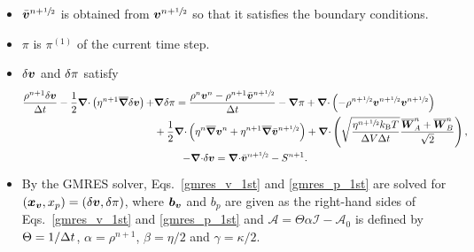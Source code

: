 \documentclass[
10pt
showpacs, showkeys,
amsmath,amssymb,
aps,
pre,
floatfix,
]{revtex4-1}
\newcommand{\divg}{{\V\nabla\cdot}}                       %
\newcommand{\paren}[1]{{(#1)}}                            %
\begin{document}
\begin{enumerate}
\begin{itemize}
\item $\bar{\boldsymbol{v}}^{n+\sfrac{1}{2}}$ is obtained from $\boldsymbol{v}^{n+\sfrac{1}{2}}$ so that it satisfies the boundary conditions.
\item $\pi$ is $\pi^\paren{1}$ of the current time step.
\item $\delta\boldsymbol{v}$ and $\delta\pi$ satisfy
\begin{gather}
\label{gmres_v_2nd}
\begin{split}
\frac{\rho^{n+1}\d{\V{v}}}{\D{t}} - \frac{1}{2}\divg\left(\eta^{n+1}\overline{\grad}\d{\V{v}}\right) + & \grad\d{\pi}
= \frac{\rho^n\V{v}^n-\rho^{n+1}\bar{\V{v}}^{n+\myhalf}}{\D{t}} - \grad\pi 
+ \divg\left(-\rho^{n+\myhalf}\V{v}^{n+\myhalf}\V{v}^{n+\myhalf}\right) \\
& + \frac{1}{2}\divg\left( \eta^n \overline{\grad}\V{v}^n + \eta^{n+1} \overline{\grad}\bar{\V{v}}^{n+\myhalf} \right)
+ \divg\left( \sqrt{\frac{\eta^{n+\myhalf} k_\mathrm{B}T}{\D{V}\D{t}} } \frac{\overline{\V{W}}^n_A + \overline{\V{W}}^n_B}{\sqrt{2}} \right),
\end{split} \\
\label{gmres_p_2nd}
-\divg\d{\V{v}} = \divg\bar{\V{v}}^{n+\myhalf}-S^{n+1}.
\end{gather}
\item By the GMRES solver, Eqs.~\eqref{gmres_v_1st} and \eqref{gmres_p_1st} are solved for $(\boldsymbol{x}_{\boldsymbol{v}},x_p)=(\delta\boldsymbol{v},\delta\pi)$, where $\boldsymbol{b}_{\boldsymbol{v}}$ and $b_p$ are given as the right-hand sides of Eqs.~\eqref{gmres_v_1st} and \eqref{gmres_p_1st} and 
$\mathcal{A}=\Theta\alpha\mathcal{I}-\mathcal{A}_0$ is defined by $\Theta=1/\Delta t$, $\alpha=\rho^{n+1}$, $\beta=\eta/2$ and $\gamma=\kappa/2$.
\end{itemize}


\end{enumerate}
\end{document}
